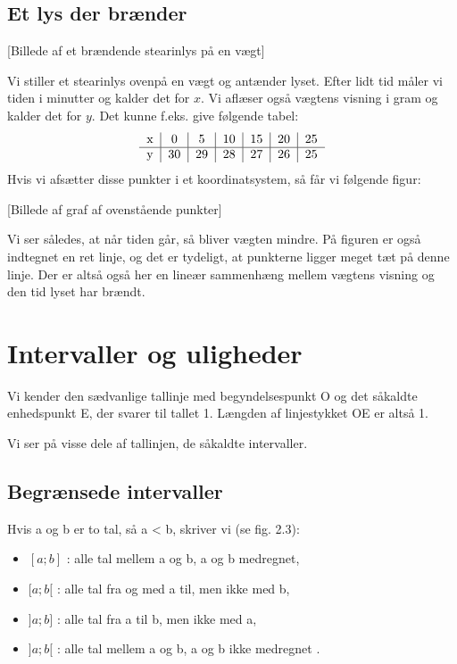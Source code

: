 \documentclass[12pt,oneside,a4paper]{article}
\begin{document}
\subsection{Et lys der brænder}
[Billede af et brændende stearinlys på en vægt]

Vi stiller et stearinlys ovenpå en vægt og antænder lyset. Efter lidt tid måler
vi tiden i minutter og kalder det for $x$. Vi aflæser også vægtens visning i
gram og kalder det for $y$. Det kunne f.eks. give følgende tabel:
$$
\begin{tabular}{c|c|c|c|c|c|c}
    x &  0 &  5 & 10 & 15 & 20 & 25 \\
    \hline
    y & 30 & 29 & 28 & 27 & 26 & 25
\end{tabular}
$$
Hvis vi afsætter disse punkter i et koordinatsystem, så får vi følgende figur:

[Billede af graf af ovenstående punkter]

Vi ser således, at når tiden går, så bliver vægten mindre.
På figuren er også indtegnet en ret linje, og det er tydeligt, at punkterne
ligger meget tæt på denne linje.  Der er altså også her en lineær sammenhæng
mellem vægtens visning og den tid lyset har brændt.

\section{Intervaller og uligheder}

Vi kender den sædvanlige tallinje med begyndelsespunkt O og det såkaldte
enhedspunkt E, der svarer til tallet 1. Længden af linjestykket OE er altså 1.

Vi ser på visse dele af tallinjen, de såkaldte intervaller.

\subsection{Begrænsede intervaller}
Hvis a og b er to tal, så a < b, skriver vi (se fig. 2.3):
\begin{itemize}
    \item $[a;b]$ : alle tal mellem a og b, a og b medregnet,
    \item $[a;b[$ : alle tal fra og med a til, men ikke med b,
    \item $]a;b]$ : alle tal fra a til b, men ikke med a,
    \item $]a;b[$ : alle tal mellem a og b, a og b ikke medregnet .
\end{itemize}
\end{document}
